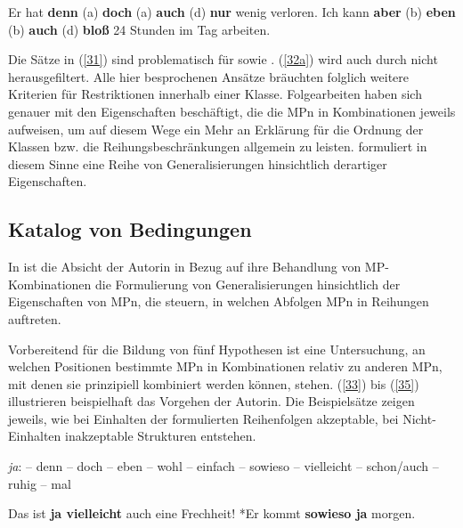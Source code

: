 \begin{exe}
	\ex\label{32} 
		\begin{xlist}	
			\ex\label{32a} Er hat \textbf{denn} (a) \textbf{doch} (a) \textbf{auch} (d) \textbf{nur} wenig verloren.
			\ex\label{32b} Ich kann \textbf{aber} (b) \textbf{eben} (b) \textbf{auch} (d) \textbf{bloß} 24 Stunden im Tag 						arbeiten.
		\end{xlist}
		\hfill\hbox{\citet[248--249]{Abraham1995}}
\end{exe}
Die Sätze in (\ref{31}) sind problematisch für \citet{Engel1968} sowie \citet{Helbig1981}. (\ref{32a}) wird auch durch \citet{Thurmair1991} nicht herausgefiltert. Alle hier bespro\-chenen Ansätze bräuchten folglich weitere Kriterien für Restriktionen innerhalb einer Klasse. 
\noindent
Folgearbeiten haben sich genauer mit den Eigenschaften beschäftigt, die die MPn in Kombinationen jeweils aufweisen, um auf diesem Wege ein Mehr an Erklärung für die Ordnung der Klassen bzw. die Reihungsbeschränkungen allgemein zu leisten. \citet{Thurmair1989, Thurmair1991} formuliert in diesem Sinne eine Reihe von Generalisie\-rungen hinsichtlich derartiger Eigenschaften.

\subsection{Katalog von Bedingungen}
\label{sec:katalog}
In \citet{Thurmair1989, Thurmair1991} ist die Absicht der Autorin in Bezug auf ihre Behandlung von MP-Kom\-bi\-na\-ti\-on\-en die Formulierung von Generalisierungen hinsichtlich der Eigenschaften von MPn, die steuern, in welchen Abfolgen MPn in Reihungen auftreten. 

Vorbereitend für die Bildung von fünf Hypothesen ist eine Untersuchung, an welchen Positionen bestimmte MPn in Kombinationen relativ zu anderen MPn, mit denen sie prinzipiell kombiniert werden können, stehen. (\ref{33}) bis (\ref{35}) illustrieren beispielhaft das Vorgehen der Autorin. Die Beispielsätze zeigen jeweils, wie bei Einhalten der formulierten Reihenfolgen akzeptable, bei Nicht-Einhalten inakzeptable Strukturen entstehen.
	
\begin{exe}
	\ex\label{33} \textit{ja}:  – denn – doch – eben – wohl – einfach – sowieso – vielleicht – schon/auch – ruhig – mal
		\begin{xlist}	
			\ex\label{33a} Das ist \textbf{ja vielleicht} auch eine Frechheit!
			\ex\label{33b} *Er kommt \textbf{sowieso ja} morgen.
		\end{xlist}
\end{exe}
	
